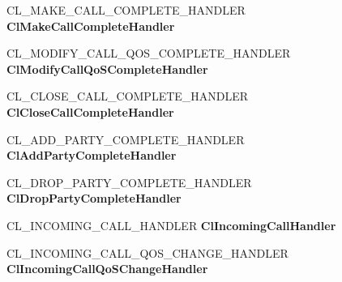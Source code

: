 \begin{DoxyCompactItemize}
C\+L\+\_\+\+M\+A\+K\+E\+\_\+\+C\+A\+L\+L\+\_\+\+C\+O\+M\+P\+L\+E\+T\+E\+\_\+\+H\+A\+N\+D\+L\+ER {\bfseries Cl\+Make\+Call\+Complete\+Handler}
\item 
\mbox{\label{struct___n_d_i_s___c_l_i_e_n_t___c_h_a_r_a_c_t_e_r_i_s_t_i_c_s_a8ca95db8927c837adb47e0af45f33e82}} 
C\+L\+\_\+\+M\+O\+D\+I\+F\+Y\+\_\+\+C\+A\+L\+L\+\_\+\+Q\+O\+S\+\_\+\+C\+O\+M\+P\+L\+E\+T\+E\+\_\+\+H\+A\+N\+D\+L\+ER {\bfseries Cl\+Modify\+Call\+Qo\+S\+Complete\+Handler}
\item 
\mbox{\label{struct___n_d_i_s___c_l_i_e_n_t___c_h_a_r_a_c_t_e_r_i_s_t_i_c_s_a6a32b1b6c1351214e7661613176404ca}} 
C\+L\+\_\+\+C\+L\+O\+S\+E\+\_\+\+C\+A\+L\+L\+\_\+\+C\+O\+M\+P\+L\+E\+T\+E\+\_\+\+H\+A\+N\+D\+L\+ER {\bfseries Cl\+Close\+Call\+Complete\+Handler}
\item 
\mbox{\label{struct___n_d_i_s___c_l_i_e_n_t___c_h_a_r_a_c_t_e_r_i_s_t_i_c_s_a7058c5de0f6c6a1aced4a1dd9ed2bf89}} 
C\+L\+\_\+\+A\+D\+D\+\_\+\+P\+A\+R\+T\+Y\+\_\+\+C\+O\+M\+P\+L\+E\+T\+E\+\_\+\+H\+A\+N\+D\+L\+ER {\bfseries Cl\+Add\+Party\+Complete\+Handler}
\item 
\mbox{\label{struct___n_d_i_s___c_l_i_e_n_t___c_h_a_r_a_c_t_e_r_i_s_t_i_c_s_acdc15d10d20cb1897c045edd87082232}} 
C\+L\+\_\+\+D\+R\+O\+P\+\_\+\+P\+A\+R\+T\+Y\+\_\+\+C\+O\+M\+P\+L\+E\+T\+E\+\_\+\+H\+A\+N\+D\+L\+ER {\bfseries Cl\+Drop\+Party\+Complete\+Handler}
\item 
\mbox{\label{struct___n_d_i_s___c_l_i_e_n_t___c_h_a_r_a_c_t_e_r_i_s_t_i_c_s_aff78d170ded863c1fb328e1d50730109}} 
C\+L\+\_\+\+I\+N\+C\+O\+M\+I\+N\+G\+\_\+\+C\+A\+L\+L\+\_\+\+H\+A\+N\+D\+L\+ER {\bfseries Cl\+Incoming\+Call\+Handler}
\item 
\mbox{\label{struct___n_d_i_s___c_l_i_e_n_t___c_h_a_r_a_c_t_e_r_i_s_t_i_c_s_aa8c774dfcc71c5e48b59e830587e0617}} 
C\+L\+\_\+\+I\+N\+C\+O\+M\+I\+N\+G\+\_\+\+C\+A\+L\+L\+\_\+\+Q\+O\+S\+\_\+\+C\+H\+A\+N\+G\+E\+\_\+\+H\+A\+N\+D\+L\+ER {\bfseries Cl\+Incoming\+Call\+Qo\+S\+Change\+Handler}

\end{DoxyCompactItemize}
